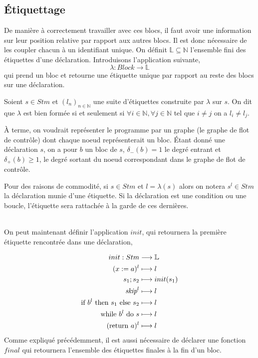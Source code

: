 \documentclass[a4paper, 10pt]{article}
\begin{document}
\subsection{Étiquettage}
De manière à correctement travailler avec ces blocs, il faut avoir une information sur leur position relative par rapport
aux autres blocs. Il est donc nécessaire de les coupler chacun à un identifiant unique. 
On définit $\mathbb{L}\subseteq\mathbb{N}$ l'ensemble fini des étiquettes d'une déclaration. Introduisons l'application suivante,
\[
	\lambda: Block \longrightarrow \mathbb{L}
\]
\newline
qui prend un bloc et retourne une étiquette unique par rapport au reste des blocs sur une déclaration.
\newline
\newline
\begin{definition}
	Soient $s \in Stm$ et $(l_n)_{n\in\mathbb{N}}$ une suite d'étiquettes construite par $\lambda$ sur $s$.
	On dit que $\lambda$ est bien formée si et seulement si $\forall i \in \mathbb{N}, \forall j \in \mathbb{N}$ 
	tel que $i \neq j$ on a $l_i \neq l_j$.
\end{definition}
\newline
À terme, on voudrait représenter le programme par un graphe (le graphe de flot de contrôle) dont chaque noeud représenterait un bloc. 
Étant donné une déclaration $s$, on a pour  $b$ un bloc de $s$, $\delta_-(b) = 1$ le degré entrant et $\delta_+(b) \ge 1$, 
le degré sortant du noeud correspondant dans le graphe de flot de contrôle.
\\
\begin{notation}
	Pour des raisons de commodité, si $s \in Stm$ et $l = \lambda(s)$ alors on notera $s^l \in Stm$ la déclaration munie d'une étiquette.
	Si la déclaration est une condition ou une boucle, l'étiquette sera rattachée à la garde de ces dernières.
\end{notation}
\\
On peut maintenant définir l'application $init$, qui retournera la première étiquette rencontrée dans une déclaration,

\begin{align*}
	init : Stm &\longrightarrow \mathbb{L}\\
	({x}\space:=\space{a})^l &\longmapsto l\\
	{s_1}\space;\space{s_2} &\longmapsto init(s_1)\\
	{\textit{skip}}^l &\longmapsto l\\
	\text{if }{b^l}\text{ then }{s_1}\text{ else }{s_2} &\longmapsto l\\
	\text{while }{b^l}\text{ do }{s} &\longmapsto l\\
	(\text{return }{a})^l & \longmapsto l
\end{align*}
Comme expliqué précédemment, il est aussi nécessaire de déclarer une fonction $final$ qui retournera l'ensemble des étiquettes finales 
à la fin d'un bloc.
\end{document}
